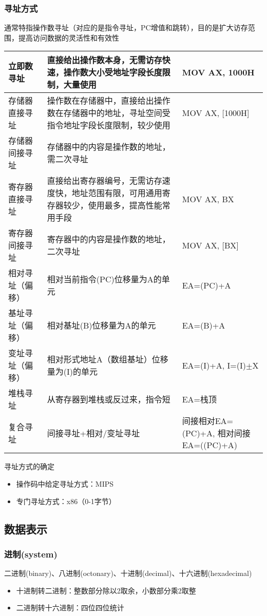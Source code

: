 \subsubsection{寻址方式}
通常特指操作数寻址（对应的是指令寻址，PC增值和跳转），目的是扩大访存范围，提高访问数据的灵活性和有效性
\begin{center}
\begin{tabular}{|m{3cm}|m{8cm}|m{4cm}|}
\hline
立即数寻址 & 直接给出操作数本身，无需访存快速，操作数大小受地址字段长度限制，大量使用 & MOV AX, 1000H\\\hline
存储器直接寻址 & 操作数在存储器中，直接给出操作数在存储器中的地址，寻址空间受指令地址字段长度限制，较少使用 & MOV AX, [1000H]\\\hline
存储器间接寻址 & 存储器中的内容是操作数的地址，需二次寻址 & \\\hline
寄存器直接寻址 & 直接给出寄存器编号，无需访存速度快，地址范围有限，可用通用寄存器较少，使用最多，提高性能常用手段 & MOV AX, BX\\\hline
寄存器间接寻址 & 寄存器中的内容是操作数的地址，二次寻址 & MOV AX, [BX]\\\hline
相对寻址（偏移） & 相对当前指令(PC)位移量为A的单元 & EA=(PC)+A\\\hline
基址寻址（偏移） & 相对基址(B)位移量为A的单元 & EA=(B)+A \\\hline
变址寻址（偏移） & 相对形式地址A（数组基址）位移量为(I)的单元 & EA=(I)+A, I=(I)$\pm$X \\\hline
堆栈寻址 & 从寄存器到堆栈或反过来，指令短 & EA=栈顶\\\hline
复合寻址 & 间接寻址+相对/变址寻址 & 间接相对EA=(PC)+A, 相对间接EA=((PC)+A)\\\hline
\end{tabular}
\end{center}
寻址方式的确定
\begin{itemize}
	\item 操作码中给定寻址方式：MIPS
	\item 专门寻址方式：x86（0-1字节）
\end{itemize}

\subsection{数据表示}
\subsubsection{进制(system)}
二进制(binary)、八进制(octonary)、十进制(decimal)、十六进制(hexadecimal)
\begin{itemize}
	\item 十进制转二进制：整数部分除以2取余，小数部分乘2取整
	\item 二进制转十六进制：四位四位统计
\end{itemize}


